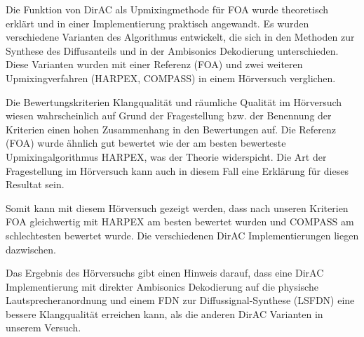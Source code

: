 Die Funktion von DirAC als Upmixingmethode für FOA wurde theoretisch erklärt und in einer Implementierung praktisch angewandt. Es wurden verschiedene Varianten des Algorithmus entwickelt, die sich in den Methoden zur Synthese des Diffusanteils und in der Ambisonics Dekodierung unterschieden. Diese Varianten wurden mit einer Referenz (FOA) und zwei weiteren Upmixingverfahren (HARPEX, COMPASS) in einem Hörversuch verglichen.

Die Bewertungskriterien Klangqualität und räumliche Qualität im Hörversuch wiesen wahrscheinlich auf Grund der Fragestellung bzw. der Benennung der Kriterien einen hohen Zusammenhang in den Bewertungen auf. Die Referenz (FOA) wurde ähnlich gut bewertet wie der am besten bewerteste Upmixingalgorithmus HARPEX, was der Theorie widerspicht. Die Art der Fragestellung im Hörversuch kann auch in diesem Fall eine Erklärung für dieses Resultat sein.

Somit kann mit diesem Hörversuch gezeigt werden, dass nach unseren Kriterien FOA gleichwertig mit HARPEX am besten bewertet wurden und COMPASS am schlechtesten bewertet wurde. Die verschiedenen DirAC Implementierungen liegen dazwischen.

Das Ergebnis des Hörversuchs gibt einen Hinweis darauf, dass eine DirAC Implementierung mit direkter Ambisonics Dekodierung auf die physische Lautsprecheranordnung und einem FDN zur Diffussignal-Synthese (LSFDN) eine bessere Klangqualität erreichen kann, als die anderen DirAC Varianten in unserem Versuch.

